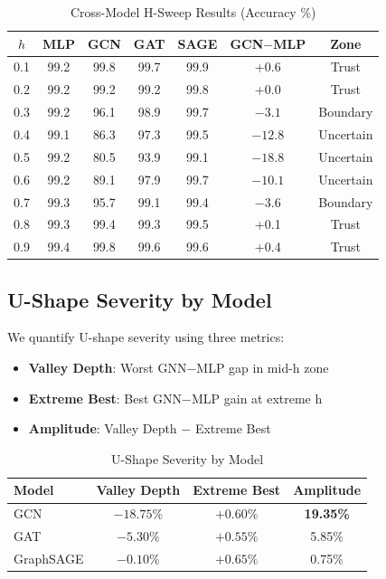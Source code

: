 \begin{table}[t]
\centering
\caption{Cross-Model H-Sweep Results (Accuracy \%)}
\label{tab:hsweep_results}
\begin{tabular}{@{}ccccccc@{}}
\toprule
$h$ & MLP & GCN & GAT & SAGE & GCN$-$MLP & Zone \\
\midrule
0.1 & 99.2 & 99.8 & 99.7 & 99.9 & +0.6 & Trust \\
0.2 & 99.2 & 99.2 & 99.2 & 99.8 & +0.0 & Trust \\
0.3 & 99.2 & 96.1 & 98.9 & 99.7 & $-3.1$ & Boundary \\
0.4 & 99.1 & 86.3 & 97.3 & 99.5 & $-12.8$ & Uncertain \\
0.5 & 99.2 & 80.5 & 93.9 & 99.1 & $-18.8$ & Uncertain \\
0.6 & 99.2 & 89.1 & 97.9 & 99.7 & $-10.1$ & Uncertain \\
0.7 & 99.3 & 95.7 & 99.1 & 99.4 & $-3.6$ & Boundary \\
0.8 & 99.3 & 99.4 & 99.3 & 99.5 & +0.1 & Trust \\
0.9 & 99.4 & 99.8 & 99.6 & 99.6 & +0.4 & Trust \\
\bottomrule
\end{tabular}
\end{table}

\subsection{U-Shape Severity by Model}

We quantify U-shape severity using three metrics:
\begin{itemize}
    \item \textbf{Valley Depth}: Worst GNN$-$MLP gap in mid-h zone
    \item \textbf{Extreme Best}: Best GNN$-$MLP gain at extreme h
    \item \textbf{Amplitude}: Valley Depth $-$ Extreme Best
\end{itemize}

\begin{table}[t]
\centering
\caption{U-Shape Severity by Model}
\label{tab:ushape_severity}
\begin{tabular}{@{}lccc@{}}
\toprule
Model & Valley Depth & Extreme Best & Amplitude \\
\midrule
GCN & $-18.75\%$ & $+0.60\%$ & \textbf{19.35\%} \\
GAT & $-5.30\%$ & $+0.55\%$ & 5.85\% \\
GraphSAGE & $-0.10\%$ & $+0.65\%$ & 0.75\% \\
\bottomrule
\end{tabular}
\end{table}

